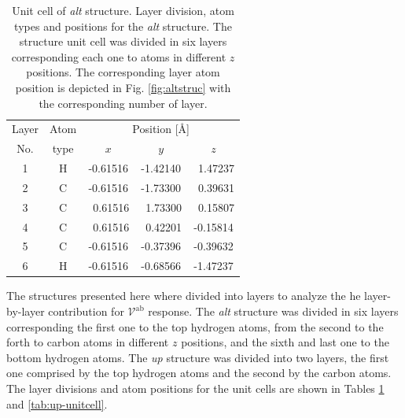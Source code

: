 \documentclass[twocolumn]{article}
\begin{document}
\begin{table}[tb]
\center
\begin{tabular}{ccccc}\\
\hline
Layer & Atom & \multicolumn{3}{c}{Position [\AA]} \\
\cline{3-5}
No. & type & $x$ & $y$ & $z$  \\
\hline
1 & H &  -0.61516 &  -1.42140 & \ 1.47237 \\
2 & C &  -0.61516 &  -1.73300 & \ 0.39631 \\
3 & C & \ 0.61516 & \ 1.73300 & \ 0.15807 \\
4 & C & \ 0.61516 & \ 0.42201 &  -0.15814 \\
5 & C &  -0.61516 &  -0.37396 &  -0.39632 \\
6 & H &  -0.61516 &  -0.68566 &  -1.47237 \\
\hline
\end{tabular}
\caption{Unit cell of \emph{alt} structure. Layer division, atom types and
positions for the \emph{alt} structure. The structure unit cell was divided in
six layers corresponding each one to atoms in different $z$ positions. The
corresponding layer atom position is depicted in Fig. \ref{fig:altstruc} with
the corresponding number of layer.}
\label{tab:alt-unitcell}
\end{table}

The structures presented here where divided into layers to analyze the he layer-
by-layer contribution for $\mathcal{V}^{\mathrm{ab}}$ response. The \emph{alt}
structure was divided in six layers corresponding the first one to the top
hydrogen atoms, from the second to the forth to carbon atoms in different $z$
positions, and the sixth and last one to the bottom hydrogen atoms. The
\emph{up} structure was divided into two layers, the first one comprised by the
top hydrogen atoms and the second by the carbon atoms. The layer divisions and
atom positions for the unit cells are shown in Tables \ref{tab:alt-unitcell} and
\ref{tab:up-unitcell}.
\end{document}
